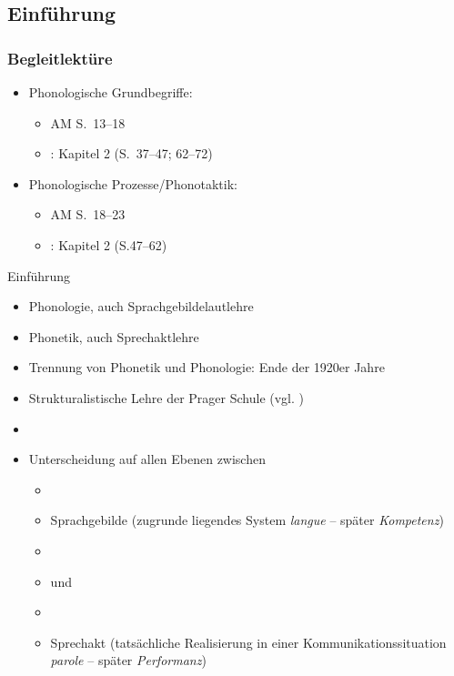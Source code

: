 \subsection{Einführung}

\begin{frame}
\frametitle{Begleitlektüre}

	\begin{itemize}
		\item Phonologische Grundbegriffe:
		\begin{itemize}
			\item AM S.~13--18
			\item \citet{Hall00a}: Kapitel 2 (S.~37--47; 62--72)  
		\end{itemize}
		\item Phonologische Prozesse/Phonotaktik: 
		\begin{itemize}
			\item AM S.~18--23
			\item  \citet{Hall00a}: Kapitel 2 (S.47--62)   
		\end{itemize}
	\end{itemize}

\end{frame}


\begin{frame}{Einführung}

\begin{itemize}
	\item  Phonologie, auch Sprachgebildelautlehre
	\item  Phonetik, auch Sprechaktlehre
	\item Trennung von Phonetik und Phonologie: Ende der 1920er Jahre
	\item Strukturalistische Lehre der Prager Schule (vgl. \cite{Trubetzkoy89a-doppelt})
	\item[]
	\item Unterscheidung auf allen Ebenen zwischen
	
	\begin{itemize}
		\item[]
		\item Sprachgebilde (zugrunde liegendes System \ras \textit{langue} -- später \textit{Kompetenz})
		\item[]
		\item[] und
		\item[]
		\item Sprechakt (tatsächliche Realisierung in einer Kommunikationssituation \textit{parole} -- später \textit{Performanz})
	\end{itemize}
	
\end{itemize}

\end{frame}



